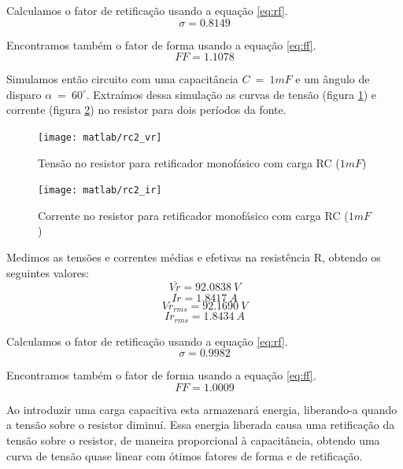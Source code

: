 \documentclass{report}
\begin{document}
Calculamos o fator de retificação usando a equação \ref{eq:rf}.
\begin{equation}
\sigma = 0.8149
\end{equation}

Encontramos também o fator de forma usando a equação \ref{eq:ff}.
\begin{equation}
FF = 1.1078
\end{equation}

Simulamos então circuito com uma capacitância $C\ =\ 1mF$ e um ângulo de disparo $\alpha\ =\ 60^\circ$. Extraímos dessa simulação as curvas de tensão (figura \ref{fig:rc2vr}) e corrente (figura \ref{fig:rc2ir}) no resistor para dois períodos da fonte.
\begin{figure}[H]
	\centering
	\texttt{[image: matlab/rc2\_vr]}
	\caption{Tensão no resistor para retificador monofásico com carga RC ($1mF$)}
	\label{fig:rc2vr}
\end{figure}
\begin{figure}[H]
	\centering
	\texttt{[image: matlab/rc2\_ir]}
	\caption{Corrente no resistor para retificador monofásico com carga RC ($1mF$)}
	\label{fig:rc2ir}
\end{figure}
Medimos as tensões e correntes médias e efetivas na resistência R, obtendo os seguintes valores:
\begin{equation}
\overline{Vr} = 92.0838\ V
\end{equation}
\begin{equation}
\overline{Ir} = 1.8417\ A
\end{equation}
\begin{equation}
Vr_{rms} = 92.1690\ V
\end{equation}
\begin{equation}
Ir_{rms} = 1.8434\ A
\end{equation}

Calculamos o fator de retificação usando a equação \ref{eq:rf}.
\begin{equation}
\sigma = 0.9982
\end{equation}

Encontramos também o fator de forma usando a equação \ref{eq:ff}.
\begin{equation}
FF = 1.0009
\end{equation}

Ao introduzir uma carga capacitiva esta armazenará energia, liberando-a quando a tensão sobre o resistor diminuí. Essa energia liberada causa uma retificação da tensão sobre o resistor, de maneira proporcional à capacitância, obtendo uma curva de tensão quase linear com ótimos fatores de forma e de retificação.


\end{document}
